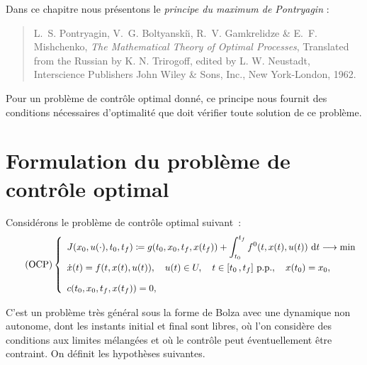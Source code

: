 Dans ce chapitre nous pr\'esentons le \emph{principe du maximum de Pontryagin} :
\begin{quotation}
\newblock L.~S. Pontryagin, V.~G. Boltyanski{\u\i}, R.~V. Gamkrelidze \& E.~F. Mishchenko,
\newblock \emph{The Mathematical Theory of Optimal Processes},
\newblock Translated from the Russian by K. N. Trirogoff, edited by L. W. Neustadt, Interscience Publishers John Wiley \& Sons, Inc., New York-London, 1962.
\end{quotation}
Pour un probl\`eme de contr\^ole optimal donn\'e, ce principe nous fournit des conditions n\'ecessaires d'optimalit\'e
que doit v\'erifier toute solution de ce probl\`eme.

\section{Formulation du probl\`eme de contr\^ole optimal}

Consid\'erons le probl\`eme de contr\^ole optimal suivant~:
\leqnomode
\begin{equation}
\tag{$\mathrm{OCP}$}
    \left\{ 
        \begin{array}{l}
            \displaystyle J(x_0,u(\cdot),t_0,t_f)   \coloneqq   \displaystyle g(t_0, x_0, t_f, x(t_f)) +
                                                \int_{t_0}^{t_f} f^0(t,x(t),u(t)) \, \diff t\longrightarrow \min \\[1.0em]
            \dot{x}(t)                      =   \displaystyle f(t,x(t),u(t)), 
                                                \quad  u(t) \in \U, 
                                                \quad t \in \intervalleff{t_0}{t_f} \text{ p.p.},
                                                \quad x(t_0) = x_0, \\[1.0em]
            c(t_0,x_0,t_f,x(t_f)) = 0,
        \end{array}
    \right. 
\label{eq:ocpGeneral}
\end{equation}
\reqnomode

C'est un probl\`eme tr\`es g\'en\'eral sous la forme de Bolza avec une dynamique non autonome, 
dont les instants initial et final sont libres, o\`u l'on consid\`ere des conditions aux limites m\'elang\'ees
et o\`u le contr\^ole peut \'eventuellement \^etre contraint. On d\'efinit les hypoth\`eses suivantes.

